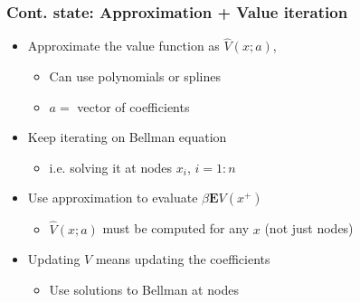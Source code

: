 \documentclass[bigger,handout]{beamer}
\begin{document}
\begin{frame}%
\frametitle{Cont. state: Approximation + Value iteration}

\begin{itemize}
\item Approximate the value function as $\hat{V}(x;a)$,

\begin{itemize}
\item Can use polynomials or splines

\item $a=$ vector of coefficients
\end{itemize}

\item Keep iterating on Bellman equation

\begin{itemize}
\item i.e. solving it at nodes $x_{i}$, $i=1:n$
\end{itemize}

\item Use approximation to evaluate $\beta \mathbf{E}V\left( x^{+}\right) $

\begin{itemize}
\item $\hat{V}(x;a)$ must be computed for any $x$ (not just nodes)
\end{itemize}

\item Updating $V$ means updating the coefficients

\begin{itemize}
\item Use solutions to Bellman at nodes
\end{itemize}
\end{itemize}

\end{frame}%
\end{document}
